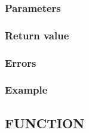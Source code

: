 \subsubsection*{Parameters}

\subsubsection*{Return value}

\subsubsection*{Errors}

\subsubsection*{Example}


\subsection{FUNCTION}

